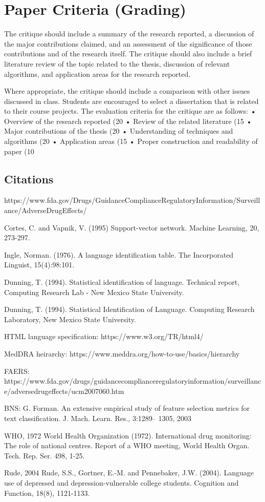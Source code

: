 \documentclass[twoside,11pt]{article}
\begin{document}
\section{Paper Criteria (Grading)}
The critique should include a summary of the research reported, a discussion of the major contributions
claimed, and an assessment of the significance of those contributions and of the research itself. The
critique should also include a brief literature review of the topic related to the thesis, discussion of relevant
algorithms, and application areas for the research reported.

Where appropriate, the critique should
include a comparison with other issues discussed in class. Students are encouraged to select a
dissertation that is related to their course projects.
The evaluation criteria for the critique are as follows:
• Overview of the research reported (20%
• Review of the related literature (15%
• Major contributions of the thesis (20%
• Understanding of techniques and algorithms (20%
• Application areas (15%
• Proper construction and readability of paper (10%




\newpage



\subsection{Citations}
https://www.fda.gov/Drugs/GuidanceComplianceRegulatoryInformation/Surveillance/AdverseDrugEffects/


Cortes, C. and Vapnik, V. (1995) Support-vector network. Machine Learning, 20, 273-297.




Ingle, Norman. (1976). A language identification table.
The Incorporated Linguist, 15(4):98:101.

Dunning, T. (1994). Statistical identification of language. Technical report, Computing
Research Lab - New Mexico State University.


Dunning, T. (1994). Statistical Identification of Language. Computing Research Laboratory,
New Mexico State University.

HTML language specification: https://www.w3.org/TR/html4/

MedDRA heirarchy:  https://www.meddra.org/how-to-use/basics/hierarchy

FAERS: https://www.fda.gov/drugs/guidancecomplianceregulatoryinformation/surveillance/adversedrugeffects/ucm2007060.htm

BNS:
G. Forman. An extensive empirical study of feature selection
metrics for text classification. J. Mach. Learn. Res., 3:1289–
1305, 2003


WHO, 1972
World Health Organization (1972). International drug monitoring: The role of national centres. Report of a WHO meeting, World Health  Organ. Tech. Rep. Ser. 498, 1-25.

Rude, 2004
Rude, S.S., Gortner, E.-M. and Pennebaker, J.W. (2004). Language use of depressed and depression-vulnerable college students. Cognition and Function, 18(8), 1121-1133.



\vskip 0.2in

\end{document}
